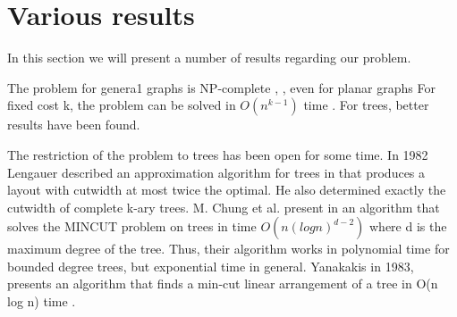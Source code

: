 \section{Various results}


In this section we will present a number of results regarding our problem. 


The problem for genera1 graphs is NP-complete \cite{Garey79}, \cite{Gavril77}, even for planar graphs \cite{MS85}
For fixed cost k, the problem can be solved in $O(n^{k-1})$ time \cite{Ma82}. For trees, better results have been found.

The restriction of the problem to trees has been open for some time.
In 1982 Lengauer described an approximation algorithm for trees in \cite{Len82}
that produces a layout with cutwidth at most twice the optimal. He also determined exactly the cutwidth of complete k-ary trees.  M. Chung et al. present in \cite{Chu82} an algorithm that solves the MINCUT problem
on trees in time $O(n(log n)^{d-2})$ where d is the maximum degree of the tree. Thus,
their algorithm works in polynomial time for bounded degree trees, but exponential
time in general. Yanakakis in 1983, presents an algorithm that finds a min-cut linear arrangement of a tree in O(n log n) time \cite{yan}. 

